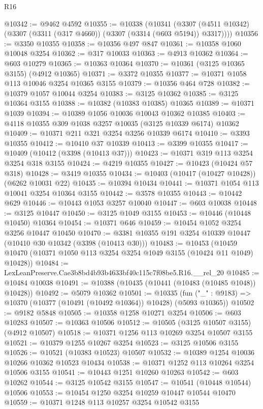 \begin{lexlean}{R16}
\begin{coremodule}
@10342 := @9462 @4592
@10355 := @10338
    (@10341 (@3307 (@4511 @10342) (@3307 (@3311 (@317 @4660)) (@3307 (@3314 (@603 @5194)) @3317))))
@10356 := @3350 @10355
@10358 := @10356 @497 @847
@10361 := @10358 @1060 @10048 @3254
@10362 := @317 @10033
@10363 := @4913 @10362
@10364 := @603 @10279
@10365 := @10363 @10364
@10370 := @10361 (@3125 @10365 @3155) (@4912 @10365)
@10371 := @3372 @10355
@10377 := @10371 @1058 @113 @10046 @3254 @10365 @3155
@10379 := @10356 @464 @728
@10382 := @10379 @1057 @10044 @3254
@10383 := @3125 @10362
@10385 := @3125 @10364 @3155
@10388 := @10382 (@10383 @10385) @10365
@10389 := @10371 @1039
@10394 := @10389 @1056 @10036 @10043 @10362 @10385
@10403 := @4118 @10355 @309 @1038 @3257 @10035 (@3125 @10339 @6174) @10362
@10409 := @10371 @211 @321 @3254 @3256 @10339 @6174
@10410 := @3393 @10355
@10412 := @10410 @37 @10339
@10413 := @3399 @10355
@10417 := @10409 (@10412 (@3398 (@10413 @37)))
@10423 := @10371 @319 @113 @3254 @3254 @318 @3155
@10424 := @4219 @10355
@10427 := @10423 (@10424 @57 @318)
@10428 := @3419 @10355
@10434 := @10403 (@10417 (@10427 @10428)) (@6262 @10031 @22)
@10435 := @10394 @10434
@10441 := @10371 @1054 @113 @10041 @3254 @10364 @3155
@10442 := @3578 @10355
@10443 := @10442 @629
@10446 := @10443 @1053 @3257 @10040
@10447 := @603 @10038
@10448 := @3125 @10447
@10450 := @3125 @1049 @3155
@10453 := @10446 (@10448 @10450) @10364
@10454 := @10371 @646
@10459 := @10454 @1052 @3254 @3256 @10447 @10450
@10470 := @3381 @10355 @191 @3254 @10339 @10447 (@10410 @30 @10342 (@3398 (@10413 @30)))
@10483 := @10453
    (@10459 @10470 (@10371 @1050 @113 @3254 @3254 @1049 @3155 (@10424 @11 @1049) @10428))
@10484 := LexLeanPreserve.Cae3b8bd4b93b4633bf40c115c7f08be5.R16.__rel_20
@10485 := @10484 @10038
@10491 := @10388 (@10435 (@10441 (@10483 (@10485 @1048)) @10428))
@10492 := @5079 @10362
@10501 := @10335
    (fun ("_" : @9183) => @10370 (@10377 (@10491 (@10492 @10364)) @10428) (@5093 @10365))
@10502 := @9182 @5848
@10505 := @10358 @1258 @10271 @3254
@10506 := @603 @10283
@10507 := @10363 @10506
@10512 := @10505 (@3125 @10507 @3155) (@4912 @10507)
@10518 := @10371 @1256 @113 @10269 @3254 @10507 @3155
@10521 := @10379 @1255 @10267 @3254
@10523 := @3125 @10506 @3155
@10526 := @10521 (@10383 @10523) @10507
@10532 := @10389 @1254 @10036 @10266 @10362 @10523 @10434
@10538 := @10371 @1252 @113 @10264 @3254 @10506 @3155
@10541 := @10443 @1251 @10260 @10263
@10542 := @603 @10262
@10544 := @3125 @10542 @3155
@10547 := @10541 (@10448 @10544) @10506
@10553 := @10454 @1250 @3254 @10259 @10447 @10544 @10470
@10559 := @10371 @1248 @113 @10257 @3254 @10542 @3155

\end{coremodule}
\end{lexlean}
